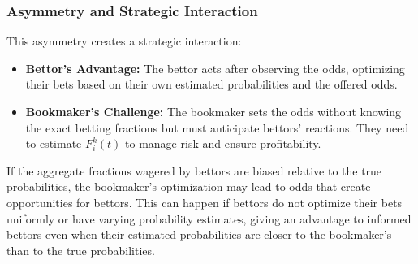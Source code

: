 \subsubsection{Asymmetry and Strategic Interaction}

This asymmetry creates a strategic interaction:

\begin{itemize}
    \item \textbf{Bettor's Advantage:} The bettor acts after observing the odds, optimizing their bets based on their own estimated probabilities and the offered odds.
    \item \textbf{Bookmaker's Challenge:} The bookmaker sets the odds without knowing the exact betting fractions but must anticipate bettors' reactions. They need to estimate \( F_i^k(t) \) to manage risk and ensure profitability.
\end{itemize}

If the aggregate fractions wagered by bettors are biased relative to the true probabilities, the bookmaker's optimization may lead to odds that create opportunities for bettors. This can happen if bettors do not optimize their bets uniformly or have varying probability estimates, giving an advantage to informed bettors even when their estimated probabilities are closer to the bookmaker's than to the true probabilities.
